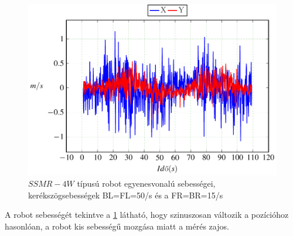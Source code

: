\begin{figure}[H]
\begin{center}
  \includegraphics[scale=0.8]{tikz/KorP0705e.pdf}
\end{center}
  \caption{$SSMR-4W$ típusú robot egyenesvonalú sebességei, kerékszögsebességek BL=FL=50\degree/s és a FR=BR=15\degree/s}
  \label{fig:KorP0705e}
\end{figure}

A robot sebességét tekintve a \ref{fig:KorP0705e} látható, hogy szinuszosan változik a pozícióhoz hasonlóan, a robot kis sebességű mozgása miatt a mérés zajos.
